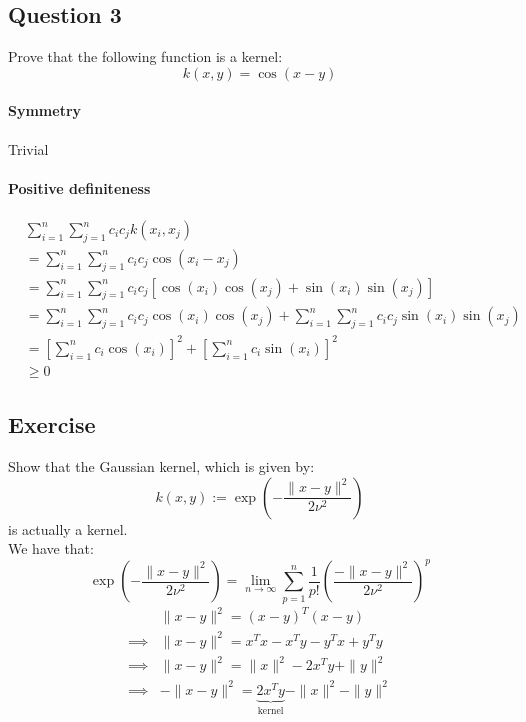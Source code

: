\documentclass{article}
\newcommand{\1}{\mathbf{1}}
\begin{document}
\subsection{Question 3}
Prove that the following function is a kernel:
\begin{equation*}
  k(x,y) = \cos(x-y)
\end{equation*}
\paragraph{Symmetry} Trivial

\paragraph{Positive definiteness}

\begin{align*}
   & \sum_{i=1}^n \sum_{j=1}^n c_i c_j k(x_i, x_j)                                                                   \\
   & = \sum_{i=1}^n \sum_{j=1}^n c_i c_j \cos(x_i - x_j)                                                             \\
   & = \sum_{i=1}^n \sum_{j=1}^n c_i c_j \left[\cos(x_i) \cos(x_j) + \sin(x_i) \sin(x_j)\right]                      \\
   & = \sum_{i=1}^n \sum_{j=1}^n c_i c_j \cos(x_i) \cos(x_j) + \sum_{i=1}^n \sum_{j=1}^n c_i c_j \sin(x_i) \sin(x_j) \\
   & = \left[\sum_{i=1}^n c_i \cos(x_i)\right]^2 + \left[\sum_{i=1}^n c_i \sin(x_i)\right]^2                         \\
   & \geq 0
\end{align*}

\subsection{Exercise}
Show that the Gaussian kernel, which is given by:
\begin{equation*}
  k(x,y) := \exp \left(- \frac{\|x-y\|^2}{2\nu^2}\right)
\end{equation*}
is actually a kernel. \\
We have that:
\begin{equation*}
  \exp \left(- \frac{\|x-y\|^2}{2\nu^2}\right) = \lim_{n \to \infty} \sum_{p=1}^n \frac{1}{p!} \left(\frac{-\|x-y\|^2}{2\nu^2}\right)^p
\end{equation*}
\begin{align*}
           & \|x-y\|^2 = (x-y)^T (x-y)                                  \\
  \implies &
  \|x-y\|^2 = x^T x - x^T y - y^T x + y^T y                             \\
  \implies &
  \|x-y\|^2 = \|x\|^2 - 2x^T y + \|y\|^2                                \\
  \implies &
  - \|x-y\|^2 = \underbrace{2x^T y}_{\text{kernel}} - \|x\|^2 - \|y\|^2 \\
\end{align*}
\end{document}
